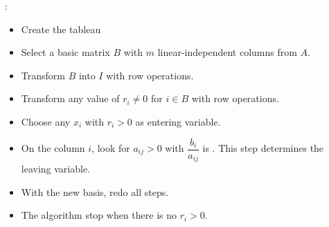   \par {}:
  \begin{itemize}
    \item Create the tableau
    \item Select a basic matrix $B$ with $m$ linear-independent columns from $A$.
    \item Transform $B$ into $I$ with row operations.
    \item Transform any value of $r_i \neq 0$ for $i \in B$ with row operations.
    \item Choose any $x_i$ with $r_i > 0$ as entering variable.
    \item On the column $i$, look for $a_{ij} > 0$ with $\dfrac{b_i}{a_{ij}}$ is . This step determines the leaving variable.
    \item With the new basis, redo all steps.
    \item The algorithm stop when there is no $r_i > 0$.
  \end{itemize}